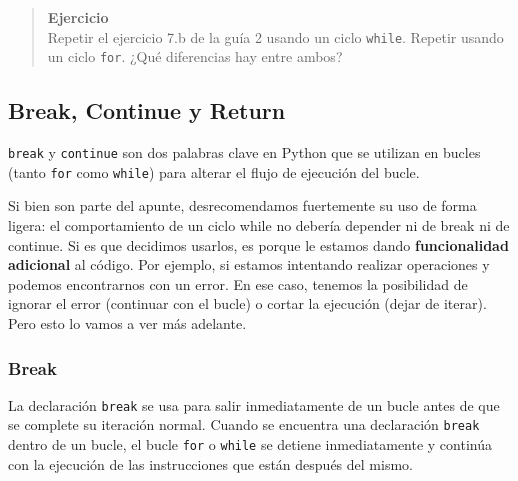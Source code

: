 \documentclass[
  letterpaper,
  DIV=11,
  numbers=noendperiod]{scrreprt}
\begin{document}
\begin{quote}
\textbf{Ejercicio}\\
Repetir el ejercicio 7.b de la guía 2 usando un ciclo \texttt{while}.
Repetir usando un ciclo \texttt{for}. ¿Qué diferencias hay entre ambos?
~
\end{quote}

\subsection{Break, Continue y Return}\label{break-continue-y-return}

\texttt{break} y \texttt{continue} son dos palabras clave en Python que
se utilizan en bucles (tanto \texttt{for} como \texttt{while}) para
alterar el flujo de ejecución del bucle.

\begin{tcolorbox}[enhanced jigsaw, arc=.35mm, toptitle=1mm, colframe=quarto-callout-warning-color-frame, bottomtitle=1mm, opacitybacktitle=0.6, colbacktitle=quarto-callout-warning-color!10!white, leftrule=.75mm, coltitle=black, toprule=.15mm, titlerule=0mm, title=\textcolor{quarto-callout-warning-color}{\faExclamationTriangle}\hspace{0.5em}{Warning}, bottomrule=.15mm, rightrule=.15mm, colback=white, breakable, opacityback=0, left=2mm]

Si bien son parte del apunte, desrecomendamos fuertemente su uso de
forma ligera: el comportamiento de un ciclo while no debería depender ni
de break ni de continue. Si es que decidimos usarlos, es porque le
estamos dando \textbf{funcionalidad adicional} al código. Por ejemplo,
si estamos intentando realizar operaciones y podemos encontrarnos con un
error. En ese caso, tenemos la posibilidad de ignorar el error
(continuar con el bucle) o cortar la ejecución (dejar de iterar). Pero
esto lo vamos a ver más adelante.

\end{tcolorbox}

\subsubsection{Break}\label{break}

La declaración \texttt{break} se usa para salir inmediatamente de un
bucle antes de que se complete su iteración normal. Cuando se encuentra
una declaración \texttt{break} dentro de un bucle, el bucle \texttt{for}
o \texttt{while} se detiene inmediatamente y continúa con la ejecución
de las instrucciones que están después del mismo.
\end{document}
